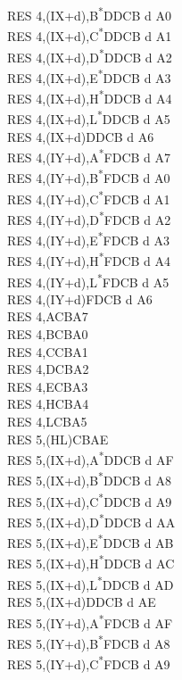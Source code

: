 \documentclass[twoside,openright,a4paper]{book}
\begin{document}
\begin{multicols}{3}
{\begin{tabbing}
	RES 4,(IX+d),B\textsuperscript{*}\>DDCB d A0\\
	RES 4,(IX+d),C\textsuperscript{*}\>DDCB d A1\\
	RES 4,(IX+d),D\textsuperscript{*}\>DDCB d A2\\
	RES 4,(IX+d),E\textsuperscript{*}\>DDCB d A3\\
	RES 4,(IX+d),H\textsuperscript{*}\>DDCB d A4\\
	RES 4,(IX+d),L\textsuperscript{*}\>DDCB d A5\\
	RES 4,(IX+d)\>DDCB d A6\\
	RES 4,(IY+d),A\textsuperscript{*}\>FDCB d A7\\
	RES 4,(IY+d),B\textsuperscript{*}\>FDCB d A0\\
	RES 4,(IY+d),C\textsuperscript{*}\>FDCB d A1\\
	RES 4,(IY+d),D\textsuperscript{*}\>FDCB d A2\\
	RES 4,(IY+d),E\textsuperscript{*}\>FDCB d A3\\
	RES 4,(IY+d),H\textsuperscript{*}\>FDCB d A4\\
	RES 4,(IY+d),L\textsuperscript{*}\>FDCB d A5\\
	RES 4,(IY+d)\>FDCB d A6\\
	RES 4,A\>CBA7\\
	RES 4,B\>CBA0\\
	RES 4,C\>CBA1\\
	RES 4,D\>CBA2\\
	RES 4,E\>CBA3\\
	RES 4,H\>CBA4\\
	RES 4,L\>CBA5\\
	RES 5,(HL)\>CBAE\\
	RES 5,(IX+d),A\textsuperscript{*}\>DDCB d AF\\
	RES 5,(IX+d),B\textsuperscript{*}\>DDCB d A8\\
	RES 5,(IX+d),C\textsuperscript{*}\>DDCB d A9\\
	RES 5,(IX+d),D\textsuperscript{*}\>DDCB d AA\\
	RES 5,(IX+d),E\textsuperscript{*}\>DDCB d AB\\
	RES 5,(IX+d),H\textsuperscript{*}\>DDCB d AC\\
	RES 5,(IX+d),L\textsuperscript{*}\>DDCB d AD\\
	RES 5,(IX+d)\>DDCB d AE\\
	RES 5,(IY+d),A\textsuperscript{*}\>FDCB d AF\\
	RES 5,(IY+d),B\textsuperscript{*}\>FDCB d A8\\
	RES 5,(IY+d),C\textsuperscript{*}\>FDCB d A9\\

\end{tabbing}}
\end{multicols}
\end{document}
